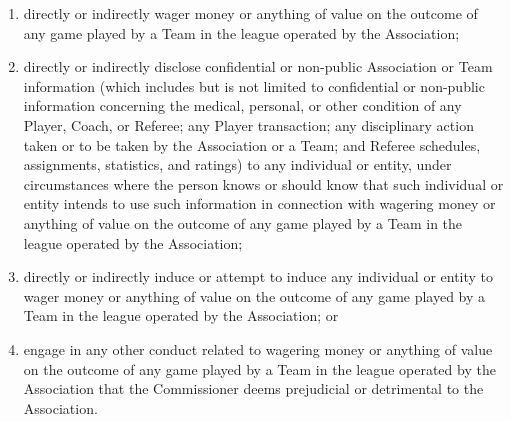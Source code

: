 \documentclass[]{book}
\providecommand{\tightlist}{%
  \setlength{\itemsep}{0pt}\setlength{\parskip}{0pt}}
\begin{document}
\begin{enumerate}
  \begin{enumerate}
  \def\labelenumii{(\roman{enumii})}
  \tightlist
  \item
    directly or indirectly wager money or anything of value on the outcome of any game played by a Team in the league operated by the Association;
  \item
    directly or indirectly disclose confidential or non-public Association or Team information (which includes but is not limited to confidential or non-public information concerning the medical, personal, or other condition of any Player, Coach, or Referee; any Player transaction; any disciplinary action taken or to be taken by the Association or a Team; and Referee schedules, assignments, statistics, and ratings) to any individual or entity, under circumstances where the person knows or should know that such individual or entity intends to use such information in connection with wagering money or anything of value on the outcome of any game played by a Team in the league operated by the Association;
  \item
    directly or indirectly induce or attempt to induce any individual or entity to wager money or anything of value on the outcome of any game played by a Team in the league operated by the Association; or
  \item
    engage in any other conduct related to wagering money or anything of value on the outcome of any game played by a Team in the league operated by the Association that the Commissioner deems prejudicial or detrimental to the Association.
  \end{enumerate}


\end{enumerate}
\end{document}
